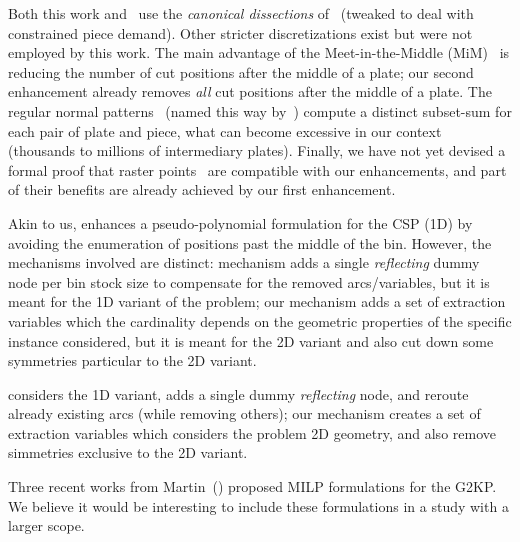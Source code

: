 \documentclass[9pt]{entcs}
\begin{document}
Both this work and~\cite{furini:2016} use the \emph{canonical dissections} of~\cite{herz:1972} (tweaked to deal with constrained piece demand).
Other stricter discretizations exist but were not employed by this work.
The main advantage of the Meet-in-the-Middle (MiM)~\cite{cote:2018} is reducing the number of cut positions after the middle of a plate; our second enhancement already removes \emph{all} cut positions after the middle of a plate.
The regular normal patterns~\cite{boschetti:2002} (named this way by~\cite{cote:2018}) compute a distinct subset-sum for each pair of plate and piece, what can become excessive in our context (thousands to millions of intermediary plates).
Finally, we have not yet devised a formal proof that raster points~\cite{terno:1987,guntram:1966} are compatible with our enhancements, and part of their benefits are already achieved by our first enhancement.

Akin to us, \cite{delorme:2019} enhances a pseudo-polynomial formulation for the CSP (1D) by avoiding the enumeration of positions past the middle of the bin.
However, the mechanisms involved are distinct: \cite{delorme:2019} mechanism adds a single \emph{reflecting} dummy node per bin stock size to compensate for the removed arcs/variables, but it is meant for the 1D variant of the problem; our mechanism adds a set of extraction variables which the cardinality depends on the geometric properties of the specific instance considered, but it is meant for the 2D variant and also cut down some symmetries particular to the 2D variant.

considers the 1D variant, adds a single dummy \emph{reflecting} node, and reroute already existing arcs (while removing others); our mechanism creates a set of extraction variables which considers the problem 2D geometry, and also remove simmetries exclusive to the 2D variant.

Three recent works from Martin~(\cite{martin:2020:models,martin:2020:top,martin:2020:bottom}) proposed MILP formulations for the G2KP.
We believe it would be interesting to include these formulations in a study with a larger scope.

\end{document}
